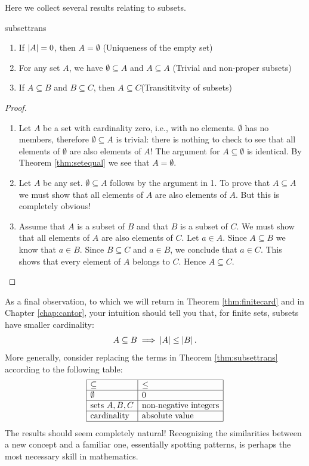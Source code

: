 Here we collect several results relating to subsets.

\begin{thm}{}{subsettrans}\hypertarget{thm:subsettranslnk}{}
\begin{enumerate}
  \item If $\left| A\right|=0$, then $A=\emptyset$ \hfill (Uniqueness of the empty set)
  \item For any set $A$, we have $\emptyset\subseteq A$ and $A\subseteq A$ \hfill (Trivial and non-proper subsets)
  \item If $A\subseteq B$ and $B\subseteq C$, then $A\subseteq C$\hfill(Transititvity of subsets)
\end{enumerate}
\end{thm}

\begin{proof}
\begin{enumerate}
  \item Let $A$ be a set with cardinality zero, i.e., with no elements. $\emptyset$ has no members, therefore $\emptyset\subseteq A$ is trivial: there is nothing to check to see that all elements of $\emptyset$ are also elements of $A$! The argument for $A\subseteq\emptyset$ is identical. By Theorem \ref{thm:setequal} we see that $A=\emptyset$.
  \item Let $A$ be any set. $\emptyset\subseteq A$ follows by the argument in 1. To prove that $A\subseteq A$ we must show that all elements of $A$ are also elements of $A$. But this is completely obvious!
  \item Assume that $A$ is a subset of $B$ and that $B$ is a subset of $C$. We must show that all elements of $A$ are also elements of $C$. Let $a\in A$. Since $A\subseteq B$ we know that $a\in B$. Since $B\subseteq C$ and $a\in B$, we conclude that $a\in C$. This shows that every element of $A$ belongs to $C$. Hence $A\subseteq C$.\qedhere
\end{enumerate}
\end{proof}

As a final observation, to which we will return in Theorem \ref{thm:finitecard} and in Chapter \ref{chap:cantor}, your intuition should tell you that, for finite sets, subsets have smaller cardinality:
\[A\subseteq B\implies\left| A\right|\le\left| B\right|.\]
More generally, consider replacing the terms in Theorem \hyperlink{thm:subsettranslnk}{\ref*{thm:subsettrans}} according to the following table:
\[\begin{array}{|l|l|}\hline
\subseteq&\le\\\hline
\emptyset&0\\\hline
\text{sets }A,B,C&\text{non-negative integers}\\\hline
\text{cardinality}&\text{absolute value}\\\hline
\end{array}\]
The results should seem completely natural! Recognizing the similarities between a new concept and a familiar one, essentially spotting patterns, is perhaps the most necessary skill in mathematics.

